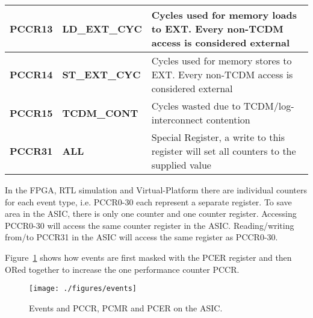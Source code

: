 \begin{table}[H]
\begin{tabularx}{\textwidth}{@{}llX@{}}
  \textbf{PCCR13} & \textbf{LD\_EXT\_CYC} & Cycles used for memory loads to EXT. Every non-TCDM access is considered external \\ \hline
  \textbf{PCCR14} & \textbf{ST\_EXT\_CYC} & Cycles used for memory stores to EXT. Every non-TCDM access is considered external \\ \hline
  \textbf{PCCR15} & \textbf{TCDM\_CONT}   & Cycles wasted due to TCDM/log-interconnect contention \\ \hline
  \textbf{PCCR31} & \textbf{ALL}          & Special Register, a write to this register will set all counters to the supplied value\\ \bottomrule
\end{tabularx}
\end{table}

In the FPGA, RTL simulation and Virtual-Platform there are individual counters
for each event type, i.e. PCCR0-30 each represent a separate register.
To save area in the ASIC, there is only one counter and one counter register.
Accessing PCCR0-30 will access the same counter register in the ASIC.
Reading/writing from/to PCCR31 in the ASIC will access the same register as
PCCR0-30.

Figure~\ref{fig:events} shows how events are first masked with the PCER register
and then ORed together to increase the one performance counter PCCR.

\begin{figure}[H]
  \centering
  \texttt{[image: ./figures/events]}
  \caption{Events and PCCR, PCMR and PCER on the ASIC.}
  \label{fig:events}
\end{figure}
